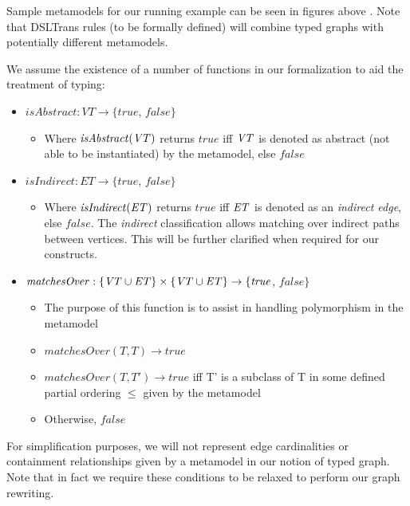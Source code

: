 Sample metamodels for our running example can be seen in figures above . Note that DSLTrans rules (to be formally defined) will combine typed graphs with potentially different metamodels.

We assume the existence of a number of functions in our formalization to aid the treatment of typing:

\begin{itemize}
\item $\mathit{isAbstract}: \mathit{VT} \rightarrow \{\mathit{true}$, $\mathit{false}\}$
\begin{itemize}
\item Where $\mathit{isAbstract}(\mathit{VT})$ returns $\mathit{true}$ iff $\mathit{VT}$ is denoted as abstract (not able to be instantiated) by the metamodel, else $\mathit{false}$
\end{itemize}

\item $\mathit{isIndirect}: \mathit{ET} \rightarrow \{\mathit{true}$, $\mathit{false}\}$
\begin{itemize}
\item Where $\mathit{isIndirect}(\mathit{ET})$ returns $\mathit{true}$ iff $\mathit{ET}$ is denoted as an \textit{indirect edge}, else $\mathit{false}$. The \textit{indirect} classification allows matching over indirect paths between vertices. This will be further clarified when required for our constructs.
\end{itemize}

\item $\mathit{matchesOver}: \{\mathit{VT} \cup \mathit{ET}\} \times \{\mathit{VT} \cup \mathit{ET}\} \rightarrow \{\mathit{true}$, $\mathit{false}\}$

\begin{itemize}
\item The purpose of this function is to assist in handling polymorphism in the metamodel
\item $\mathit{matchesOver}(T, T) \rightarrow \mathit{true}$
\item $\mathit{matchesOver}(T, T') \rightarrow \mathit{true}$ iff T' is a subclass of T in some defined partial ordering $\leq$ given by the metamodel
\item Otherwise, $\mathit{false}$
\end{itemize}
\end{itemize}

For simplification purposes, we will not represent edge cardinalities or containment relationships given by a metamodel in our notion of typed graph. Note that in fact we require these conditions to be relaxed to perform our graph rewriting.

